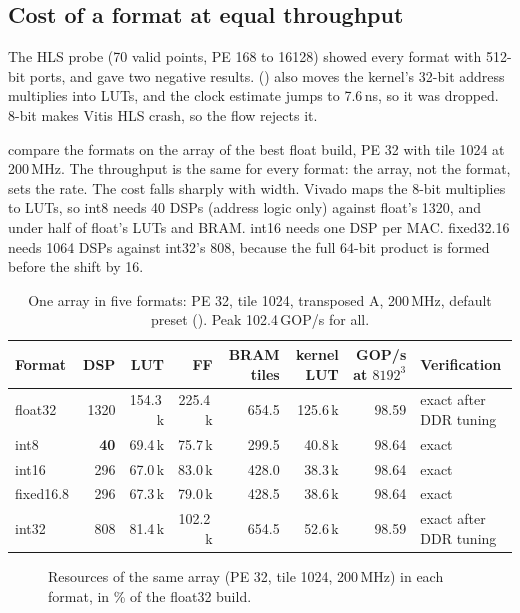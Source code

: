 \subsection{Cost of a format at equal throughput}
The HLS probe (70 valid points, PE 16\x{}8 to 16\x{}128) showed every format with 512-bit ports, and gave two negative
results.  () also moves the kernel's 32-bit address
multiplies into LUTs, and the clock estimate jumps to 7.6\,ns, so it was dropped. 8-bit  makes Vitis
HLS crash, so the flow rejects it.

 compare the formats on the array of the best float build, PE 32 with tile
1024 at 200\,MHz. The throughput is the same for every format: the array, not the format, sets the rate. The cost
falls sharply with width. Vivado maps the 8-bit multiplies to LUTs, so int8 needs 40 DSPs (address logic only)
against float's 1320, and under half of float's LUTs and BRAM. int16 needs one DSP per MAC. fixed32.16 needs 1064 DSPs
against int32's 808, because the full 64-bit product is formed before the shift by 16.

\begin{table}[ht]
\centering\small
\caption{One array in five formats: PE 32, tile 1024, transposed A, 200\,MHz, default preset
  (). Peak 102.4\,GOP/s for all.}
\label{tab:same}
\begin{tabular}{@{}lrrrrrrl@{}}
\toprule
Format & DSP & LUT & FF & BRAM tiles & kernel LUT & GOP/s at \(8192^3\) & Verification \\
\midrule
float32 & 1320 & 154.3\,k & 225.4\,k & 654.5 & 125.6\,k & 98.59 & exact after DDR tuning \\
int8 & \textbf{40} & 69.4\,k & 75.7\,k & 299.5 & 40.8\,k & 98.64 & exact \\
int16 & 296 & 67.0\,k & 83.0\,k & 428.0 & 38.3\,k & 98.64 & exact \\
fixed16.8 & 296 & 67.3\,k & 79.0\,k & 428.5 & 38.6\,k & 98.64 & exact \\
int32 & 808 & 81.4\,k & 102.2\,k & 654.5 & 52.6\,k & 98.59 & exact after DDR tuning \\
\bottomrule
\end{tabular}
\end{table}

\begin{figure}[ht]
  \centering
  
  \caption{Resources of the same array (PE 32, tile 1024, 200\,MHz) in each format, in \% of the float32
    build.}
  \label{fig:formats_cost}
\end{figure}

